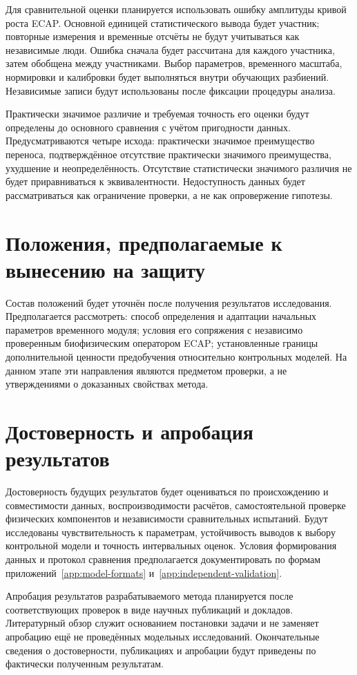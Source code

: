 Для сравнительной оценки планируется использовать ошибку амплитуды кривой роста ECAP. Основной единицей статистического вывода будет участник; повторные измерения и временные отсчёты не будут учитываться как независимые люди. Ошибка сначала будет рассчитана для каждого участника, затем обобщена между участниками. Выбор параметров, временного масштаба, нормировки и калибровки будет выполняться внутри обучающих разбиений. Независимые записи будут использованы после фиксации процедуры анализа.

Практически значимое различие и требуемая точность его оценки будут определены до основного сравнения с учётом пригодности данных. Предусматриваются четыре исхода: практически значимое преимущество переноса, подтверждённое отсутствие практически значимого преимущества, ухудшение и неопределённость. Отсутствие статистически значимого различия не будет приравниваться к эквивалентности. Недоступность данных будет рассматриваться как ограничение проверки, а не как опровержение гипотезы.

\section*{Положения, предполагаемые к вынесению на защиту}
Состав положений будет уточнён после получения результатов исследования. Предполагается рассмотреть: способ определения и адаптации начальных параметров временного модуля; условия его сопряжения с независимо проверенным биофизическим оператором ECAP; установленные границы дополнительной ценности предобучения относительно контрольных моделей. На данном этапе эти направления являются предметом проверки, а не утверждениями о доказанных свойствах метода.

\section*{Достоверность и апробация результатов}
Достоверность будущих результатов будет оцениваться по происхождению и совместимости данных, воспроизводимости расчётов, самостоятельной проверке физических компонентов и независимости сравнительных испытаний. Будут исследованы чувствительность к параметрам, устойчивость выводов к выбору контрольной модели и точность интервальных оценок. Условия формирования данных и протокол сравнения предполагается документировать по формам приложений~\ref{app:model-formats} и~\ref{app:independent-validation}.

Апробация результатов разрабатываемого метода планируется после соответствующих проверок в виде научных публикаций и докладов. Литературный обзор служит основанием постановки задачи и не заменяет апробацию ещё не проведённых модельных исследований. Окончательные сведения о достоверности, публикациях и апробации будут приведены по фактически полученным результатам.

